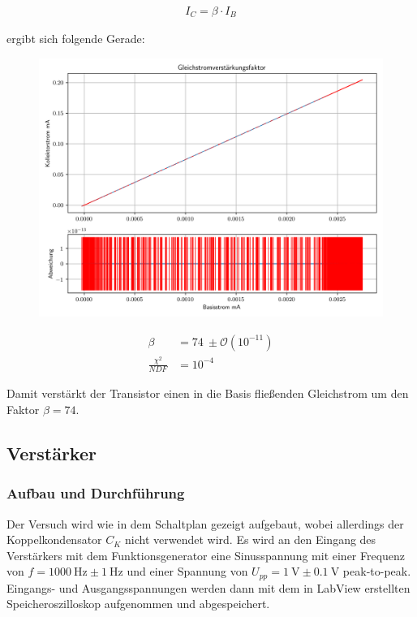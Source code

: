 \documentclass[12pt,twoside,a4paper]{scrartcl}
\begin{document}
        \begin{align*}
            I_C = \beta \cdot I_B
        \end{align*}

        ergibt sich folgende Gerade:

        \begin{figure}[H]
            \begin{minipage}{0.69 \textwidth}
                \includegraphics[width = 0.8 \textwidth]{Plots/Transistor/gsvf}
            \end{minipage}
            \begin{minipage}{0.29 \textwidth}
                \begin{align*}
                    \beta &= \SI{74}{} \pm \mathcal{O}(10^{-11}) \\
                    \frac{\chi^2}{NDF} &= 10^{-4}
                \end{align*}
            \end{minipage}
        \end{figure}

				Damit verstärkt der Transistor einen in die Basis fließenden Gleichstrom um den Faktor $\beta = 74$.

    \subsection{Verstärker}

			\subsubsection{Aufbau und Durchführung}

			Der Versuch wird wie in dem Schaltplan gezeigt aufgebaut, wobei allerdings der Koppelkondensator $C_K$ nicht verwendet wird.
			Es wird an den Eingang des Verstärkers mit dem Funktionsgenerator eine Sinusspannung mit einer Frequenz von $f = \SI{1000}{\hertz} \pm \SI{1}{\hertz}$
		  und einer Spannung von $U_{pp} = \SI{1}{\volt} \pm \SI{0.1}{\volt}$ peak-to-peak.
			Eingangs- und Ausgangsspannungen werden dann mit dem in LabView erstellten Speicheroszilloskop aufgenommen und abgespeichert.
\end{document}
